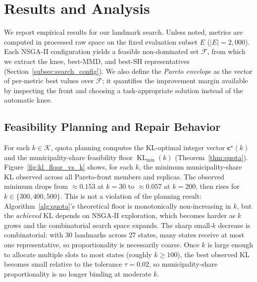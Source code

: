 \documentclass[10pt,journal]{IEEEtran}
\newcommand{\kGrid}{\mathcal{K}}
\newcommand{\1}{\mathbf{1}}
\newcommand{\bc}{\mathbf{c}}
\DeclareMathOperator{\KL}{KL}
\theoremstyle{ieeethm}
\begin{document}
\section{Results and Analysis}
\label{sec:results_analysis}

We report empirical results for our landmark search. Unless noted, metrics are computed in processed raw space on the fixed evaluation subset $E$ ($|E|=2{,}000$). Each NSGA-II configuration yields a feasible non-dominated set $\mathcal{F}$, from which we extract the knee, best-MMD, and best-SH representatives (Section~\ref{subsec:search_config}). We also define the \emph{Pareto envelope} as the vector of per-metric best values over $\mathcal{F}$; it quantifies the improvement margin available by inspecting the front and choosing a task-appropriate solution instead of the automatic knee.

\subsection{Feasibility Planning and Repair Behavior}
\label{subsec:q_feasibility}

For each $k\in\kGrid$, quota planning computes the KL-optimal integer vector $\bc^\star(k)$ and the municipality-share feasibility floor $\KL_{\min}(k)$ (Theorem~\ref{thm:quota}). Figure~\ref{fig:kl_floor_vs_k} shows, for each $k$, the minimum municipality-share KL observed across all Pareto-front members and replicas. The observed minimum drops from $\approx 0.153$ at $k=30$ to $\approx 0.057$ at $k=200$, then rises for $k\in\{300,400,500\}$. This is not a violation of the planning result: Algorithm~\ref{alg:quota}'s theoretical floor is monotonically non-increasing in $k$, but the \emph{achieved} KL depends on NSGA-II exploration, which becomes harder as $k$ grows and the combinatorial search space expands. The sharp small-$k$ decrease is combinatorial: with 30 landmarks across 27 states, many states receive at most one representative, so proportionality is necessarily coarse. Once $k$ is large enough to allocate multiple slots to most states (roughly $k\geq 100$), the best observed KL becomes small relative to the tolerance $\tau=0.02$, so municipality-share proportionality is no longer binding at moderate $k$.
\end{document}
